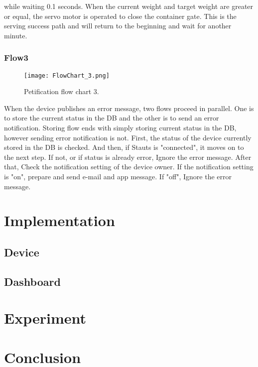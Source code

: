 \documentclass[conference]{IEEEtran}
\begin{document}
while waiting 0.1 seconds. When the current weight and target weight are greater or equal, the servo motor is operated to close the container gate. This is the serving success path and will return to the beginning and wait for another minute.

\hfill \break
\subsubsection{Flow3}
\begin{figure}[htbp]
\centerline{\texttt{[image: FlowChart\_3.png]}}
\caption{Petification flow chart 3.}
\label{fig}
\end{figure}
When the device publishes an error message, two flows proceed in parallel. One is to store the current status in the DB and the other is to send an error notification.
Storing flow ends with simply storing current status in the DB, however sending error notification is not.
First, the status of the device currently stored in the DB is checked. And then, if Stauts is "connected", it moves on to the next step. If not, or if status is already error, Ignore the error message. After that, Check the notification setting of the device owner. If the notification setting is "on", prepare and send e-mail and app message. If "off", Ignore the error message. 

\section{Implementation}
\subsection{Device}
\subsection{Dashboard}
\inde

\section{Experiment}
\section{Conclusion}
\end{document}
